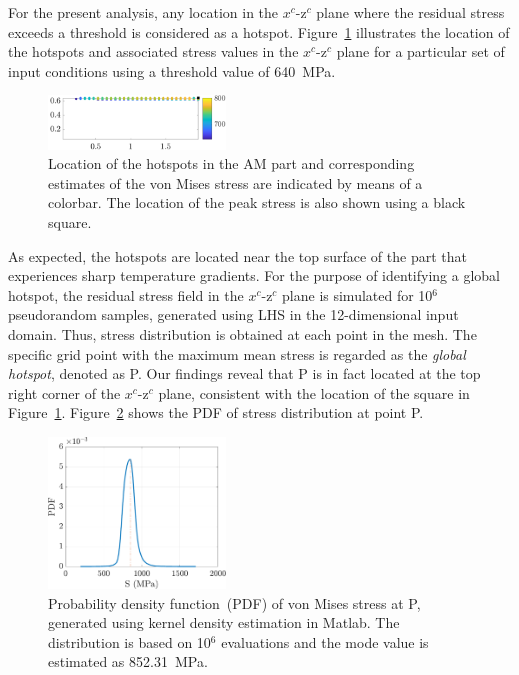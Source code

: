 For the present analysis, any location in the $x^c$-z$^c$ plane
where the residual stress exceeds a threshold is considered as a hotspot. Figure~\ref{fig:hs} illustrates the 
location of the hotspots and associated stress values in the $x^c$-z$^c$ plane for a particular set of
input conditions using a threshold value of 640~MPa. 
%
\begin{figure}[htbp]
\begin{center}
\includegraphics[width=0.42\textwidth]{./Figures/loc_hotspot10}
\end{center}
\caption{Location of the hotspots in the AM part and corresponding estimates of the von Mises stress
are indicated by means of a colorbar. The location of the peak stress is also shown using a black square.}
\label{fig:hs}
\end{figure}
%
As expected, the hotspots are located near the top surface of the part that experiences sharp temperature
gradients. For the purpose of identifying a global hotspot, the residual stress
field in the $x^c$-z$^c$ plane is simulated for 10$^6$ pseudorandom samples, generated using LHS
in the 12-dimensional input domain. Thus, stress distribution is obtained at each point in the mesh. 
The specific grid point with the maximum mean stress is regarded as the \textit{global hotspot},
denoted as P. Our findings reveal that P is in fact located at the top right corner of the $x^c$-z$^c$
plane, consistent with the location of the square in Figure~\ref{fig:hs}.
Figure~\ref{fig:kde_S} shows the PDF of stress distribution at point P. 
%
\begin{figure}[htbp]
\begin{center}
\includegraphics[width=0.42\textwidth]{./Figures/kde_S_mumax}
\end{center}
\caption{Probability density function~(PDF) of von Mises stress at P, generated using kernel density estimation in 
Matlab. The distribution is based on 10$^6$ evaluations and the mode value is estimated as 852.31~MPa.}
\label{fig:kde_S}
\end{figure}


